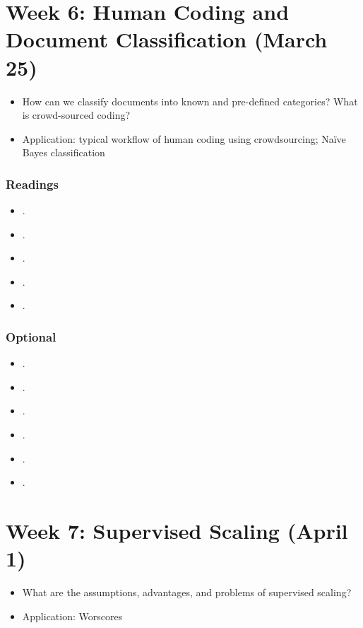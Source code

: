 \documentclass[abstract=on,parskip=full,headings=standardclasses,fontsize=11pt,paper=a4]{scrartcl}
\begin{document}
\section{Week 6: Human Coding and Document Classification (March 25)}

\begin{itemize}
\item How can we classify documents into known and pre-defined categories? What is crowd-sourced coding?
\item Application: typical workflow of human coding using crowdsourcing; Naïve Bayes classification
\end{itemize}

\subsubsection*{Readings}
\begin{itemize}
\item {}.
\item {}.
\item {}.
\item {}.
\item {}.
\end{itemize}

\subsubsection*{Optional}
\begin{itemize}
\item {}.
\item {}.
\item {}.
\item {}.
\item {}.
\item {}.
\end{itemize}

 
\section{Week 7:  Supervised Scaling (April 1)}

\begin{itemize}
\item What are the assumptions, advantages, and problems of supervised scaling?
\item Application: Worscores
\end{itemize}
\end{document}
